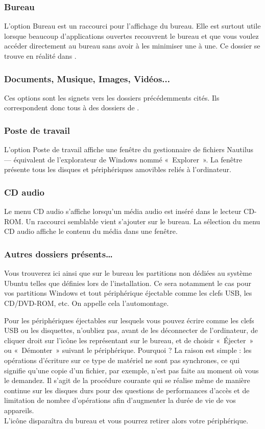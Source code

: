 \subsubsection{Bureau}
L'option Bureau est un raccourci pour l'affichage du bureau. Elle est surtout utile lorsque beaucoup d'applications ouvertes recouvrent le bureau et que vous voulez accéder directement au bureau sans avoir à les minimiser une à une. Ce dossier se trouve en réalité dans .
\subsubsection{Documents, Musique, Images, Vidéos...}
Ces options sont les signets vers les dossiers précédemments cités. Ils correspondent donc tous à des dossiers de .
\subsubsection{Poste de travail}
L'option Poste de travail affiche une fenêtre du gestionnaire de fichiers Nautilus --- équivalent  de l'explorateur de Windows nommé «~Explorer~». La fenêtre présente tous les disques et périphériques amovibles reliés à l'ordinateur. 
\subsubsection{CD audio}
Le menu CD audio s'affiche lorsqu'un média audio est inséré dans le lecteur CD-ROM. Un raccourci semblable vient s'ajouter sur le bureau. La sélection du menu CD audio affiche le contenu du média dans une fenêtre. 
\subsubsection{Autres dossiers présents\ldots{}}
\label{AutrePartitions}
Vous trouverez ici ainsi que sur le bureau les partitions non dédiées au système Ubuntu telles que définies lors de l'installation. Ce sera notamment le cas pour vos partitions Windows et tout périphérique éjectable comme les clefs USB, les CD/DVD-ROM, etc. On appelle cela l'automontage.\par
Pour les périphériques éjectables sur lesquels vous pouvez écrire comme les clefs USB ou les disquettes, n'oubliez pas, avant de les déconnecter de l'ordinateur, de cliquer droit sur l'icône les représentant sur le bureau, et de choisir «~Éjecter~» ou «~Démonter~» suivant le périphérique. Pourquoi ? La raison est simple : les opérations d'écriture sur ce type de matériel ne sont pas synchrones, ce qui signifie qu'une copie d'un fichier, par exemple, n'est pas faite au moment où vous le demandez. Il s'agit de la procédure courante qui se réalise même de manière continue sur les disques durs pour des questions de performances d'accès et de limitation de nombre d'opérations afin d'augmenter la durée de vie de vos appareils.\\
L'icône disparaîtra du bureau et vous pourrez retirer alors votre périphérique.
